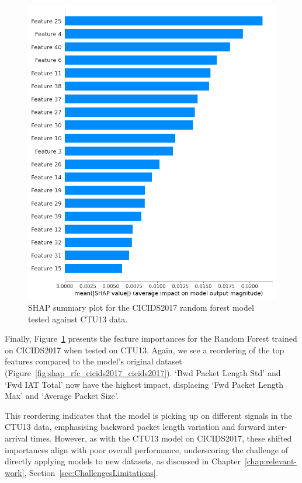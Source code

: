 \begin{figure}[H]
\centering
\includegraphics[width=\textwidth]{img/SHAP_RFCICIDS2017_CTU13.png}
\caption{SHAP summary plot for the CICIDS2017 random forest model tested against CTU13 data.}\label{fig:shap_rfc_cicids2017_ctu13}
\end{figure}

Finally, Figure~\ref{fig:shap_rfc_cicids2017_ctu13} presents the feature importances for the Random Forest trained on CICIDS2017 when tested on CTU13. Again, we see a reordering of the top features compared to the model's original dataset (Figure~\ref{fig:shap_rfc_cicids2017_cicids2017}). `Bwd Packet Length Std' and `Fwd IAT Total' now have the highest impact, displacing `Fwd Packet Length Max' and `Average Packet Size'.

This reordering indicates that the model is picking up on different signals in the CTU13 data, emphasising backward packet length variation and forward inter-arrival times. However, as with the CTU13 model on CICIDS2017, these shifted importances align with poor overall performance, underscoring the challenge of directly applying models to new datasets, as discussed in Chapter~\ref{chap:relevant-work}, Section~\ref{sec:ChallengesLimitations}.

